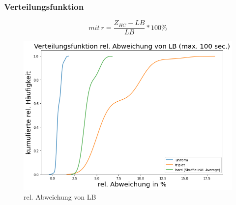 \documentclass{beamer}
\begin{document}
\begin{frame}

\frametitle{Verteilungsfunktion}

\begin{footnotesize}
\begin{equation}
mit \ r = \frac{Z_{HC}-LB}{LB} * 100\%
\end{equation}
\end{footnotesize}

\begin{figure}[!htbp]
\begin{center}
\includegraphics[scale=0.3]{img/dist3.png}
\end{center}
\caption{rel. Abweichung von LB}
\label{fig:architecture}
\end{figure}



\end{frame}
\end{document}
